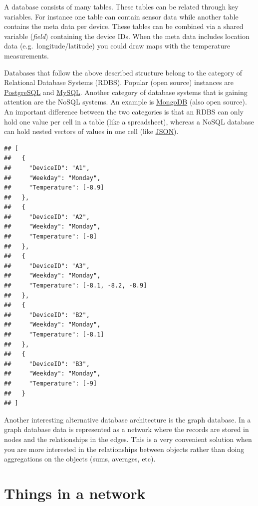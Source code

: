 \documentclass[]{book}
\theoremstyle{definition}
\theoremstyle{definition}
\theoremstyle{remark}
\begin{document}
A database consists of many tables. These tables can be related through
key variables. For instance one table can contain sensor data while
another table contains the meta data per device. These tables can be
combined via a shared variable (\emph{field}) containing the device IDs.
When the meta data includes location data (e.g.~longitude/latitude) you
could draw maps with the temperature measurements.

Databases that follow the above described structure belong to the
category of Relational Database Systems (RDBS). Popular (open source)
instances are \href{https://www.postgresql.org/}{PostgreSQL} and
\href{https://www.mysql.com/}{MySQL}. Another category of database
systems that is gaining attention are the NoSQL systems. An example is
\href{https://www.mongodb.com/}{MongoDB} (also open source). An
important difference between the two categories is that an RDBS can only
hold one value per cell in a table (like a spreadsheet), whereas a NoSQL
database can hold nested vectors of values in one cell (like
\href{http://www.json.org/}{JSON}).

\begin{verbatim}
## [
##   {
##     "DeviceID": "A1",
##     "Weekday": "Monday",
##     "Temperature": [-8.9]
##   },
##   {
##     "DeviceID": "A2",
##     "Weekday": "Monday",
##     "Temperature": [-8]
##   },
##   {
##     "DeviceID": "A3",
##     "Weekday": "Monday",
##     "Temperature": [-8.1, -8.2, -8.9]
##   },
##   {
##     "DeviceID": "B2",
##     "Weekday": "Monday",
##     "Temperature": [-8.1]
##   },
##   {
##     "DeviceID": "B3",
##     "Weekday": "Monday",
##     "Temperature": [-9]
##   }
## ]
\end{verbatim}

\citep[Video:][]{google_developers_google_nodate}

Another interesting alternative database architecture is the graph
database. In a graph database data is represented as a network where the
records are stored in nodes and the relationships in the edges. This is
a very convenient solution when you are more interested in the
relationships between objects rather than doing aggregations on the
objects (sums, averages, etc).

\citep[Video:][]{neo4j_-_the_worlds_leading_graph_database_intro_nodate}

\section{Things in a network}\label{things-in-a-network}
\end{document}
